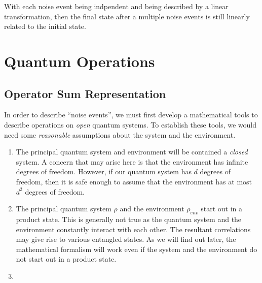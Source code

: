 \documentclass{article}
\begin{document}
With each noise event being indpendent and being described by a linear transformation,
then the final state after a multiple
noise events is still linearly related to
the initial state.
\section{Quantum Operations}

\subsection{Operator Sum Representation}
In order to describe ``noise events'', we must first develop a mathematical
tools to describe operations on \textit{open} quantum systems. To establish
these tools, we would need some \textit{reasonable} assumptions about the system and the
environment.
\begin{enumerate}
  \item The principal quantum system and environment will be contained a
  \textit{closed} system. A concern that may arise here is that the environment
  has infinite degrees of freedom. However, if our quantum system has \(d\)
  degrees of freedom, then it is safe enough to assume that the environment
  has at most \(d^2\) degrees of freedom.
  \item The principal quantum system \(\rho\) and the environment \(\rho_{env}\)
  start out in a product state. This is generally not true as the quantum system
  and the environment constantly interact with each other. The resultant
  correlations may give rise to various entangled states. As we will find out
  later, the mathematical formalism will work even if the system and the
  environment do not start out in a product state.
  \item
\end{enumerate}
\end{document}
